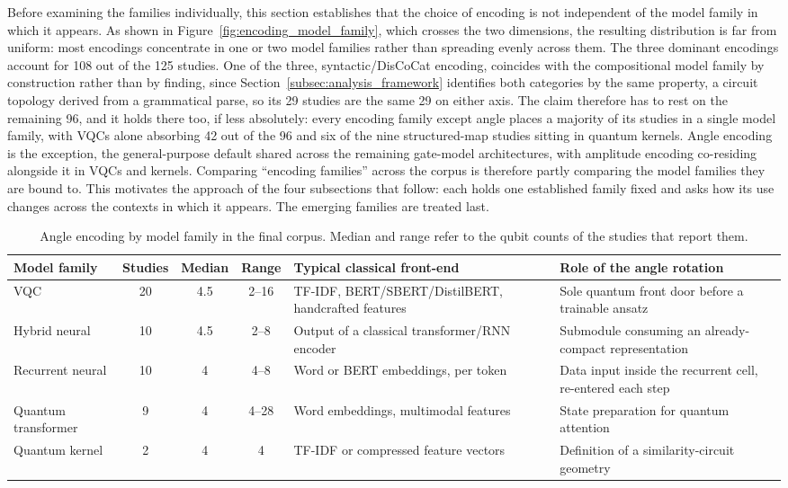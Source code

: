 \documentclass{ieeeaccess}
\begin{document}
Before examining the families individually, this section establishes that the choice of encoding is not independent of the model family in which it appears. As shown in Figure~\ref{fig:encoding_model_family}, which crosses the two dimensions, the resulting distribution is far from uniform: most encodings concentrate in one or two model families rather than spreading evenly across them. The three dominant encodings account for 108 out of the 125 studies. One of the three, syntactic/DisCoCat encoding, coincides with the compositional model family by construction rather than by finding, since Section~\ref{subsec:analysis_framework} identifies both categories by the same property, a circuit topology derived from a grammatical parse, so its 29 studies are the same 29 on either axis. The claim therefore has to rest on the remaining 96, and it holds there too, if less absolutely: every encoding family except angle places a majority of its studies in a single model family, with VQCs alone absorbing 42 out of the 96 and six of the nine structured-map studies sitting in quantum kernels. Angle encoding is the exception, the general-purpose default shared across the remaining gate-model architectures, with amplitude encoding co-residing alongside it in VQCs and kernels. Comparing ``encoding families'' across the corpus is therefore partly comparing the model families they are bound to. This motivates the approach of the four subsections that follow: each holds one established family fixed and asks how its use changes across the contexts in which it appears. The emerging families are treated last.

\begin{table}[t!]
\caption{Angle encoding by model family in the final corpus. Median and range refer to the qubit counts of the studies that report them.}
\label{tab:angle_by_family}
\centering
\footnotesize
\renewcommand{\arraystretch}{1.3}
\setlength{\tabcolsep}{5pt}
\begin{tabular}{@{}l c c c p{} p{}@{}}
\hline
\textbf{Model family} & \textbf{Studies} & \textbf{Median} & \textbf{Range} & \textbf{Typical classical front-end} & \textbf{Role of the angle rotation} \\
\hline
VQC & 20 & 4.5 & 2--16 & \raggedright TF-IDF, BERT/SBERT/DistilBERT, handcrafted features & \raggedright Sole quantum front door before a trainable ansatz \tabularnewline
Hybrid neural & 10 & 4.5 & 2--8 & \raggedright Output of a classical transformer/RNN encoder & \raggedright Submodule consuming an already-compact representation \tabularnewline
Recurrent neural & 10 & 4 & 4--8 & \raggedright Word or BERT embeddings, per token & \raggedright Data input inside the recurrent cell, re-entered each step \tabularnewline
Quantum transformer & 9 & 4 & 4--28 & \raggedright Word embeddings, multimodal features & \raggedright State preparation for quantum attention \tabularnewline
Quantum kernel & 2 & 4 & 4 & \raggedright TF-IDF or compressed feature vectors & \raggedright Definition of a similarity-circuit geometry \tabularnewline
\hline
\end{tabular}
\end{table}
\end{document}
